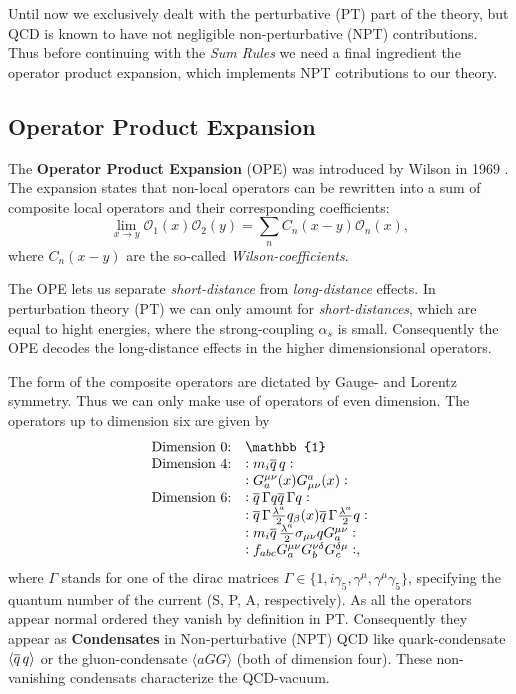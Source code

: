 \documentclass[../../index.tex]{subfiles}
\begin{document}
Until now we exclusively dealt with the perturbative (PT) part of the theory,
but QCD is known to have not negligible non-perturbative (NPT) contributions.
Thus before continuing with the \textit{Sum Rules} we need a final ingredient
the operator product expansion, which implements NPT cotributions to our theory.


\subsection{Operator Product Expansion}
The \textbf{Operator Product Expansion} (OPE) was introduced by Wilson in 1969
\cite{Wilson1969}. The expansion states that non-local operators can be
rewritten into a sum of composite local operators and their corresponding
coefficients:
\begin{equation}
  \label{eq:OPE}
  \lim_{x\to y} \mathcal{O}_1(x) \mathcal{O}_2(y) = \sum_n C_n(x-y)\mathcal{O}_n(x),
\end{equation}
where $C_n(x-y)$ are the so-called \textit{Wilson-coefficients}.

The OPE lets us separate \textit{short-distance} from \textit{long-distance}
effects. In perturbation theory (PT) we can only amount for
\textit{short-distances}, which are equal to hight energies, where the
strong-coupling $\alpha_s$ is small. Consequently the OPE decodes the
long-distance effects in the higher dimensionsional operators.

The form of the composite operators are dictated by Gauge- and Lorentz symmetry.
Thus we can only make use of operators of even dimension. The operators up to
dimension six are given by \cite{Pascual1984}
\begin{equation}
  \begin{array}{ll}
    \text{Dimension 0:} & \mathbb{1} \\
    \text{Dimension 4:} & :m_i \anti{q} q: \\
                        & :G_a^{\mu\nu}(x) G_{\mu\nu}^a(x): \\
    \text{Dimension 6:} & :\anti{q} \Gamma q \anti{q} \Gamma q: \\
                        & :\anti{q} \Gamma \frac{\lambda^a}{2} q_\beta(x) \anti{q} \Gamma \frac{\lambda^a}{2} q: \\
                        & :m_i \anti{q} \frac{\lambda^a}{2} \sigma_{\mu\nu} q G^{\mu\nu}_a: \\
                        & :f_{abc} G_a^{\mu\nu} G_b^{\nu\delta} G_c^{\delta\mu}:,
  \end{array}
\end{equation}
where $\Gamma$ stands for one of the dirac matrices $\Gamma \in \{1, i \gamma_5,
\gamma^\mu, \gamma^\mu \gamma_5\}$, specifying the quantum number of the current
(S, P, A, respectively). As all the operators appear normal ordered they vanish
by definition in PT. Consequently they appear as \textbf{Condensates} in
Non-perturbative (NPT) QCD like quark-condensate $\langle \overline{q}\, q \rangle$ or
the gluon-condensate $\langle a GG \rangle$ (both of dimension four). These
non-vanishing condensats characterize the QCD-vacuum.
\end{document}

